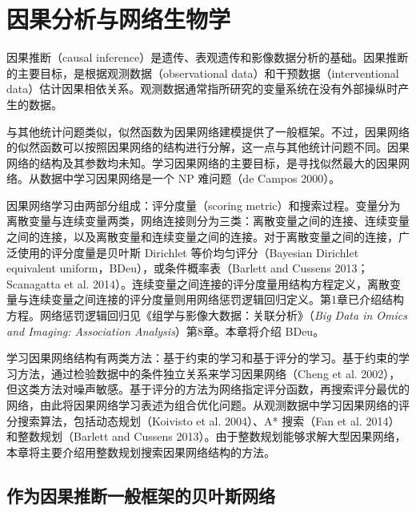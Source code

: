 \chapter{因果分析与网络生物学}
\label{ch:causal-network-biology}

因果推断（causal inference）是遗传、表观遗传和影像数据分析的基础。因果推断的主要目标，是根据观测数据（observational data）和干预数据（interventional data）估计因果相依关系。观测数据通常指所研究的变量系统在没有外部操纵时产生的数据。

与其他统计问题类似，似然函数为因果网络建模提供了一般框架。不过，因果网络的似然函数可以按照因果网络的结构进行分解，这一点与其他统计问题不同。因果网络的结构及其参数均未知。学习因果网络的主要目标，是寻找似然最大的因果网络。从数据中学习因果网络是一个 NP 难问题（de Campos 2000）。

因果网络学习由两部分组成：评分度量（scoring metric）和搜索过程。变量分为离散变量与连续变量两类，网络连接则分为三类：离散变量之间的连接、连续变量之间的连接，以及离散变量和连续变量之间的连接。对于离散变量之间的连接，广泛使用的评分度量是贝叶斯 Dirichlet 等价均匀评分（Bayesian Dirichlet equivalent uniform，BDeu），或条件概率表（Barlett and Cussens 2013；Scanagatta et al. 2014）。连续变量之间连接的评分度量用结构方程定义，离散变量与连续变量之间连接的评分度量则用网络惩罚逻辑回归定义。第1章已介绍结构方程。网络惩罚逻辑回归见《组学与影像大数据：关联分析》（\textit{Big Data in Omics and Imaging: Association Analysis}）第8章。本章将介绍 BDeu。

学习因果网络结构有两类方法：基于约束的学习和基于评分的学习。基于约束的学习方法，通过检验数据中的条件独立关系来学习因果网络（Cheng et al. 2002），但这类方法对噪声敏感。基于评分的方法为网络指定评分函数，再搜索评分最优的网络，由此将因果网络学习表述为组合优化问题。从观测数据中学习因果网络的评分搜索算法，包括动态规划（Koivisto et al. 2004）、A* 搜索（Fan et al. 2014）和整数规划（Barlett and Cussens 2013）。由于整数规划能够求解大型因果网络，本章将主要介绍用整数规划搜索因果网络结构的方法。

\section{作为因果推断一般框架的贝叶斯网络}
\label{sec:ch02-bayesian-framework}

